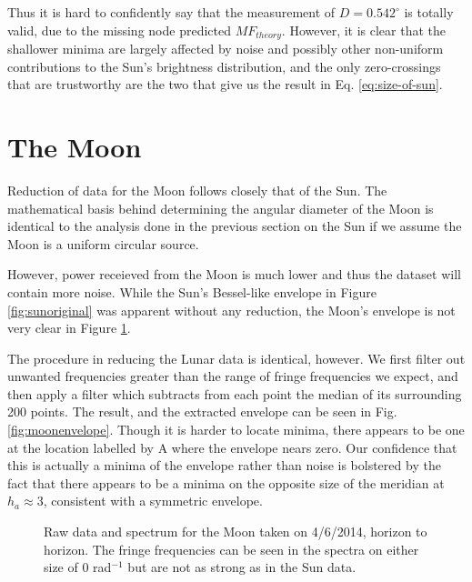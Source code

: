 \documentclass[12pt]{article}
\begin{document}
Thus it is hard to confidently say that the measurement of $D = 0.542^\circ$ is totally valid, due to the missing node predicted $MF_{theory}$. However, it is clear that the shallower minima are largely affected by noise and possibly other non-uniform contributions to the Sun's brightness distribution, and the only zero-crossings that are trustworthy are the two that give us the result in Eq. \ref{eq:size-of-sun}.

\section{The Moon}
Reduction of data for the Moon follows closely that of the Sun. The mathematical basis behind determining the angular diameter of the Moon is identical to the analysis done in the previous section on the Sun if we assume the Moon is a uniform circular source.

However, power receieved from the Moon is much lower and thus the dataset will contain more noise. While the Sun's Bessel-like envelope in Figure \ref{fig:sunoriginal} was apparent without any reduction, the Moon's envelope is not very clear in Figure \ref{fig:moonoriginal}.

The procedure in reducing the Lunar data is identical, however. We first filter out unwanted frequencies greater than the range of fringe frequencies we expect, and then apply a filter which subtracts from each point the median of its surrounding 200 points. The result, and the extracted envelope can be seen in Fig. \ref{fig:moonenvelope}. Though it is harder to locate minima, there appears to be one at the location labelled by A where the envelope nears zero. Our confidence that this is actually a minima of the envelope rather than noise is bolstered by the fact that there appears to be a minima on the opposite size of the meridian at $h_a\approx 3$, consistent with a symmetric envelope.

\begin{figure}[H]
\caption[SODUMB]{Raw data and spectrum for the Moon taken on 4/6/2014, horizon to horizon. The fringe frequencies can be seen in the spectra on either size of 0 rad$^{-1}$ but are not as strong as in the Sun data.}
\label{fig:moonoriginal}
\end{figure}
\end{document}
